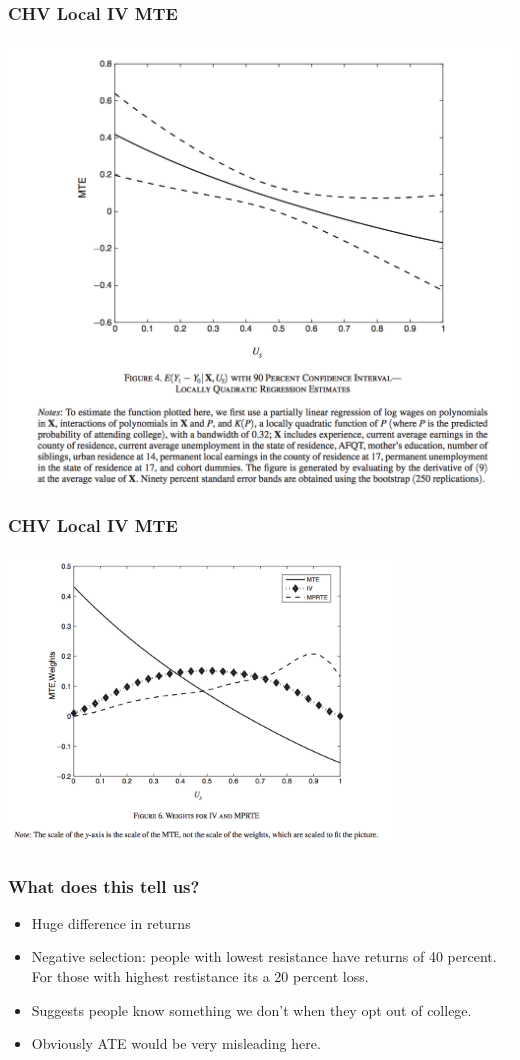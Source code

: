 \begin{frame}
  \frametitle{CHV Local IV MTE}
\vspace{-20pt}
\begin{center}
\includegraphics[width= 1.05\textwidth]{./resources/chv_fig4}
\end{center}
\end{frame}

\begin{frame}
  \frametitle{CHV Local IV MTE}
  \begin{center}
  \includegraphics[width=4in]{./resources/chv_fig6}
  \end{center}
\end{frame}
  

\begin{frame}
  \frametitle{What does this tell us?}
  \begin{itemize}
  \item Huge difference in returns
  \item Negative selection: people with lowest resistance have returns of 40 percent. For those with highest restistance its a 20 percent loss. 
  \item Suggests people know something we don't when they opt out of college.  
  \item Obviously ATE would be very misleading here. 
  
  \end{itemize}
\end{frame}

